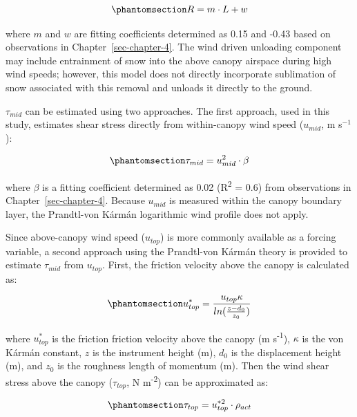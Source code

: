 \documentclass[
  letterpaper,
]{tex/uofsthesis-cs}
\begin{document}
\begin{equation}\phantomsection\label{eq-fm-05}{
R = m \cdot L + w
}\end{equation}

where \(m\) and \(w\) are fitting coefficients determined as 0.15 and
-0.43 based on observations in Chapter~\ref{sec-chapter-4}. The wind
driven unloading component may include entrainment of snow into the
above canopy airspace during high wind speeds; however, this model does
not directly incorporate sublimation of snow associated with this
removal and unloads it directly to the ground.

\(\tau_{mid}\) can be estimated using two approaches. The first
approach, used in this study, estimates shear stress directly from
within-canopy wind speed (\(u_{mid}\), m s\(^{-1}\)):

\begin{equation}\phantomsection\label{eq-tau-wind}{
\tau_{mid} = u_{mid}^2 \cdot \beta
}\end{equation}

where \(\beta\) is a fitting coefficient determined as 0.02
(R\textsuperscript{2} = 0.6) from observations in
Chapter~\ref{sec-chapter-4}. Because \(u_{mid}\) is measured within the
canopy boundary layer, the Prandtl-von Kármán logarithmic wind profile
does not apply.

Since above-canopy wind speed (\(u_{top}\)) is more commonly available
as a forcing variable, a second approach using the Prandtl-von Kármán
theory is provided to estimate \(\tau_{mid}\) from \(u_{top}\). First,
the friction velocity above the canopy is calculated as:

\begin{equation}\phantomsection\label{eq-ustar-wind}{
u^*_{top}  = \frac{u_{top}\kappa}{ln(\frac{z - d_0}{z_0})}
}\end{equation}

where \(u^*_{top}\) is the friction friction velocity above the canopy
(m s\textsuperscript{-1}), \(\kappa\) is the von Kármán constant, \(z\)
is the instrument height (m), \(d_0\) is the displacement height (m),
and \(z_0\) is the roughness length of momentum (m). Then the wind shear
stress above the canopy (\(\tau_{top}\), N m\textsuperscript{-2}) can be
approximated as:

\begin{equation}\phantomsection\label{eq-tau-ustar}{
\tau_{top} = u^{*2}_{top} \cdot \rho_{act}
}\end{equation}
\end{document}
